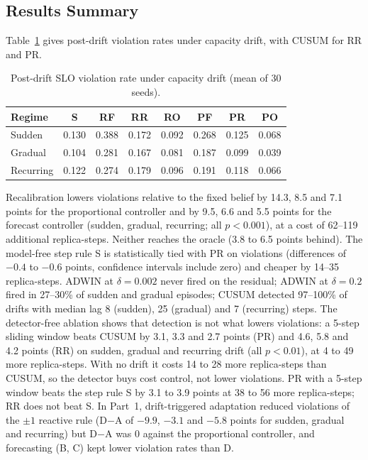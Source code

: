 \subsection{Results Summary}
Table~\ref{tab:cap} gives post-drift violation rates under capacity drift, with CUSUM for RR and PR.
\begin{table}[h]
\centering
\caption{Post-drift SLO violation rate under capacity drift (mean of 30 seeds).}
\label{tab:cap}
\begin{tabular}{lccccccc}
\toprule
Regime & S & RF & RR & RO & PF & PR & PO \\
\midrule
Sudden    & 0.130 & 0.388 & 0.172 & 0.092 & 0.268 & 0.125 & 0.068 \\
Gradual   & 0.104 & 0.281 & 0.167 & 0.081 & 0.187 & 0.099 & 0.039 \\
Recurring & 0.122 & 0.274 & 0.179 & 0.096 & 0.191 & 0.118 & 0.066 \\
\bottomrule
\end{tabular}
\end{table}
Recalibration lowers violations relative to the fixed belief by 14.3, 8.5 and 7.1 points for the proportional controller and by 9.5, 6.6 and 5.5 points for the forecast controller (sudden, gradual, recurring; all $p<0.001$), at a cost of 62--119 additional replica-steps. Neither reaches the oracle (3.8 to 6.5 points behind). The model-free step rule S is statistically tied with PR on violations (differences of $-0.4$ to $-0.6$ points, confidence intervals include zero) and cheaper by 14--35 replica-steps. ADWIN at $\delta=0.002$ never fired on the residual; ADWIN at $\delta=0.2$ fired in 27--30\% of sudden and gradual episodes; CUSUM detected 97--100\% of drifts with median lag 8 (sudden), 25 (gradual) and 7 (recurring) steps. The detector-free ablation shows that detection is not what lowers violations: a 5-step sliding window beats CUSUM by 3.1, 3.3 and 2.7 points (PR) and 4.6, 5.8 and 4.2 points (RR) on sudden, gradual and recurring drift (all $p<0.01$), at 4 to 49 more replica-steps. With no drift it costs 14 to 28 more replica-steps than CUSUM, so the detector buys cost control, not lower violations. PR with a 5-step window beats the step rule S by 3.1 to 3.9 points at 38 to 56 more replica-steps; RR does not beat S. In Part~1, drift-triggered adaptation reduced violations of the $\pm1$ reactive rule (D$-$A of $-9.9$, $-3.1$ and $-5.8$ points for sudden, gradual and recurring) but D$-$A was $0$ against the proportional controller, and forecasting (B, C) kept lower violation rates than D.

